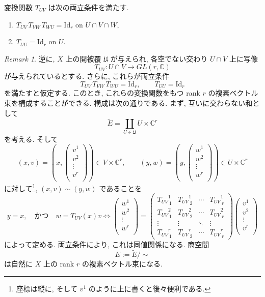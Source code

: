 \documentclass[dvipdfmx,a4paper,11pt]{article} %
\theoremstyle{definition}
\theoremstyle{remark}
\newtheorem{remark}[thm]{Remark}
\numberwithin{equation}{section}
\begin{document}
変換関数 \(T_{UV}\) は次の両立条件を満たす.
\begin{enumerate}
\item[(G-1)] $T_{UV}\,T_{VW}\,T_{WU}=\mathrm{Id}_r
\text{ on } U\cap V\cap W,$
\item[(G-2)] $T_{UU}=\mathrm{Id}_r
\text{ on } U.$
\end{enumerate}

\begin{remark}
逆に, \(X\) 上の開被覆 \(\mathfrak{U}\) が与えられ, 各空でない交わり \(U\cap V\) 上に写像
\[
T_{UV}\colon U\cap V\longrightarrow GL(r,\mathbb{C})
\]
が与えられているとする. さらに, これらが両立条件
\[
T_{UV}\,T_{VW}\,T_{WU}=\mathrm{Id}_r,
\qquad
T_{UU}=\mathrm{Id}_r
\]
を満たすと仮定する. このとき, これらの変換関数をもつ rank \(r\) の複素ベクトル束を構成することができる. 構成は次の通りである. まず, 互いに交わらない和として
\[
\widetilde{E}=\coprod_{U\in\mathfrak{U}} U\times \mathbb{C}^r
\]
を考える. そして
\[
(x,v)=(x,  \begin{pmatrix}
v^{1} \\
v^{2}\\
\vdots \\
v^{r}\\
\end{pmatrix})\in V\times \mathbb{C}^r,\qquad (y,w)=
(y,  \begin{pmatrix}
w^{1} \\
w^{2}\\
\vdots \\
w^{r}\\
\end{pmatrix}
)
\in U\times \mathbb{C}^r
\]
に対して\footnote{座標は縦に, そして \(v^{1}\) のように上に書くと後々便利である.}, \((x,v)\sim (y,w)\) であることを
\begin{equation}
y=x,\quad \text{かつ} \quad w=T_{UV}(x)v 
\Leftrightarrow 
\begin{pmatrix}
w^{1} \\
w^{2}\\
\vdots \\
w^{r}\\
\end{pmatrix}
=
\begin{pmatrix}
{T_{UV}}^{1}_{\ 1} & {T_{UV}}^{1}_{\ 2}& \cdots & {T_{UV}}^{1}_{\ r}\\
{T_{UV}}^{2}_{\ 1} & {T_{UV}}^{2}_{\ 2}& \cdots & {T_{UV}}^{2}_{\ r}\\
\vdots & \vdots & \ddots & \vdots\\
{T_{UV}}^{r}_{\ 1}& {T_{UV}}^{r}_{\ 2}& \cdots & {T_{UV}}^{r}_{\ r}
\end{pmatrix}
\begin{pmatrix}
v^{1} \\
v^{2}\\
\vdots \\
v^{r}\\
\end{pmatrix}
\end{equation}
によって定める. 両立条件により, これは同値関係になる. 商空間
\[
E:=\widetilde{E}/\sim
\]
は自然に \(X\) 上の rank \(r\) の複素ベクトル束になる.
\end{remark}
\end{document}
